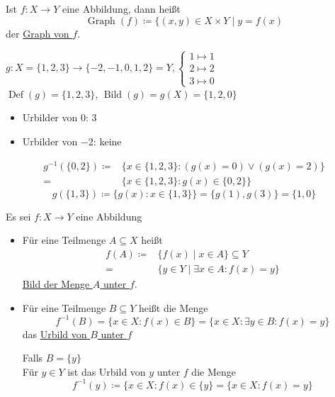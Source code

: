 \documentclass{gadsescript}
\begin{document}
\begin{definition}[Graph]
	Ist $ f : X \to Y $ eine Abbildung, dann heißt
	\[ \operatorname{Graph}(f) \coloneqq \{ ( x, y ) \in X \times Y \mid y = f(x) \]
	der \underline{Graph von $ f $}.
	\begin{example}
		\begin{math}
			g : X = \{ 1, 2, 3 \} \to \{ -2 , -1, 0, 1, 2 \} = Y,%
			\begin{cases}
				1 \mapsto 1\\
				2 \mapsto 2\\
				3 \mapsto 0
			\end{cases}
		\end{math}\\
		$ \operatorname{Def}(g) = \{ 1, 2, 3 \} $, $ \operatorname{Bild}(g) = g(X) = \{ 1, 2, 0 \} $
		\begin{itemize}
			\item Urbilder von $ 0 $: $ 3 $
			\item Urbilder von $ - 2 $: keine
		\end{itemize}
		\begin{align*}
			g^{-1}(\{ 0, 2 \}) \coloneqq &\{ x \in \{ 1, 2, 3 \} : ( g(x) = 0 ) \vee ( g(x) = 2 )\}\\
			= &\{ x \in \{ 1, 2, 3 \} : g(x) \in \{ 0, 2 \} \}
		\end{align*}
		\[ g(\{ 1, 3 \}) \coloneqq \{ g(x) : x \in \{ 1, 3 \} \} = \{ g(1), g(3) \} = \{ 1, 0 \} \]
	\end{example}
\end{definition}

\begin{definition}
	Es sei $ f : X \to Y $ eine Abbildung
	\begin{itemize}
		\item[\circled{1}] Für eine Teilmenge $ A \subseteq X $ heißt
			\begin{align*}
				f(A) \coloneq &\{ f(x) \mid x \in A \} \subseteq Y\\
				= &\{ y \in Y \mid \exists x \in A : f(x) = y \}
			\end{align*}
			\underline{Bild der Menge $ A $ unter $ f $}.
		\item[\circled{2}] Für eine Teilmenge $ B \subseteq Y $ heißt die Menge
			\[ f^{-1}(B) = \{ x \in X : f(x) \in B \} = \{ x \in X : \exists y \in B : f(x) = y \} \]
			das \underline{Urbild von $ B $ unter $ f $}\par
			Falls $ B = \{ y \} $\\
			Für $ y \in Y $ ist das Urbild von $ y $ unter $ f $ die Menge
			\[ f^{-1}(y) \coloneqq \{ x \in X : f(x) \in \{ y \} = \{ x \in X : f(x) = y \} \]
	\end{itemize}
\end{definition}
\end{document}
